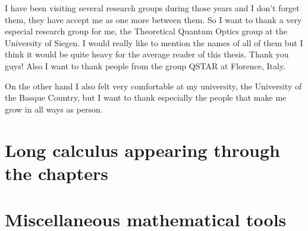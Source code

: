 \documentclass[12pt, letterpaper, twoside]{article}
\numberwithin{equation}{section}
\numberwithin{figure}{section}
\numberwithin{table}{section}
\begin{document}
I have been visiting several research groups during those years and I don't forget them, they have accept me as one more between them.
So I want to thank a very especial research group for me, the Theoretical Quantum Optics group at the University of Siegen.
I would really like to mention the names of all of them but I think it would be quite heavy for the average reader of this thesis.
Thank you guys!
Also I want to thank people from the group QSTAR at Florence, Italy.

On the other hand I also felt very comfortable at my university, the University of the Basque Country, but I want to thank especially the people that make me grow in all ways as person.

\cleardoublepage


\renewcommand{\headrulewidth}{0.5pt}
\fancyfoot[LE,RO]{\thepage}
\fancyhead[LE]{\rightmark}
\fancyhead[RO]{\leftmark}












\appendix

\section{Long calculus appearing through the chapters}
\label{app:longcacl}


\section{Miscellaneous mathematical tools}


\cleardoublepage


\end{document}
